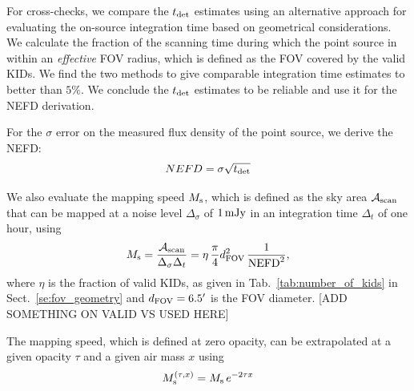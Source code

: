For cross-checks, we compare the $t_{\rm{det}}$ estimates using an
alternative approach for evaluating the on-source integration
time based on geometrical considerations. We calculate the
fraction of the scanning time during which the point source in within
an \emph{effective} FOV radius, which is defined as the FOV covered by the
valid KIDs. We find the two methods to give comparable integration
time estimates to better than $5\%$. We conclude the $t_{\rm{det}}$
estimates to be reliable and use it for the NEFD derivation.  

For the $\sigma$ error on the measured flux density of
the point source, we derive the NEFD:
\begin{equation}
  NEFD = \sigma \sqrt{t_{\rm{det}}}
  \label{eq:nefd_det}
\end{equation}

We also evaluate the mapping speed $M_{\rm{s}}$, which is defined as the sky area
$\mathcal{A}_{\rm{scan}}$ that can be mapped at a noise level
$\Delta_\sigma$ of $1\,\rm{mJy}$ in an integration time $\Delta_t$ of
one hour, using
%
\begin{equation}
M_{\rm{s}} = \frac{\mathcal{A}_{\rm{scan}}}{\Delta_\sigma\Delta_t} = \eta \, \frac{\pi}{4} d_{\rm{FOV}}^2 \, \frac{1}{\rm{NEFD}^2},
\end{equation}
%
where $\eta$ is the fraction of valid KIDs, as given in
Tab.~\ref{tab:number_of_kids} in Sect.~\ref{se:fov_geometry} and
$d_{\rm{FOV}} = 6.5'$ is the FOV diameter.
[ADD SOMETHING ON VALID VS USED HERE]

The mapping speed, which is
defined at zero opacity, can be extrapolated at a given opacity $\tau$
and a given air mass $x$ using
\begin{equation}
M_{\rm{s}}^{(\tau, x)} = M_{\rm{s}}\, e^{-2 \tau x}
\end{equation}


